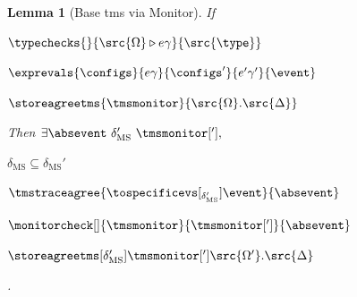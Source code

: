 \documentclass[a4paper,names,dvipsnames]{article}
\newtheorem{lemma}{Lemma}
\begin{document}
\begin{lemma}[Base \gls{tms} via Monitor]\label{lem:basetmsmonitor}
  If
  \begin{assumptions}
    \item $\typechecks{}{\src{\Omega}\triangleright e\gamma}{\src{\type}}$
    \item $\exprevals{\configs}{e\gamma}{\configs'}{e'\gamma'}{\event}$
    \item $\storeagreetms{\tmsmonitor}{\src{\Omega}.\src{\Delta}}$
  \end{assumptions}
  Then $\exists \absevent\ \delta_{\text{MS}}'\ \tmsmonitor['],$
  \begin{goals}
    \item $\delta_{\text{MS}}\subseteq\delta_{\text{MS}}'$
    \item $\tmstraceagree{\tospecificevs[_{\delta_{\text{MS}}'}]{\event}}{\absevent}$
    \item $\monitorcheck[]{\tmsmonitor}{\tmsmonitor[']}{\absevent}$
    \item $\storeagreetms[\delta_{\text{MS}}']{\tmsmonitor[']}{\src{\Omega'}.\src{\Delta}}$
  \end{goals}.
\end{lemma}
\end{document}
